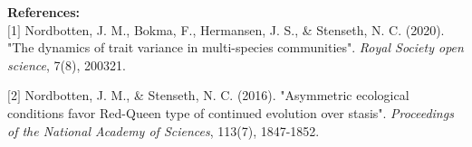 \documentclass[a4paper,11pt]{scrartcl}
\begin{document}
\textbf{References:}\\

$[$1$]$ Nordbotten, J. M., Bokma, F., Hermansen, J. S., \& Stenseth, N. C. (2020). "The dynamics of trait variance in multi-species communities". \textit{Royal Society open science}, 7(8), 200321. 

$[$2$]$ Nordbotten, J. M., \& Stenseth, N. C. (2016). "Asymmetric ecological conditions favor Red-Queen type of continued evolution over stasis". \textit{Proceedings of the National Academy of Sciences}, 113(7), 1847-1852.
\end{document}
